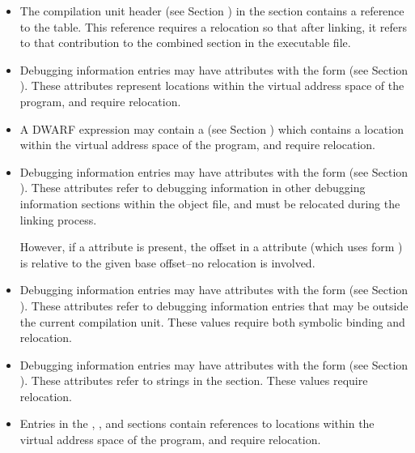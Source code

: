 \begin{itemize}
\item The compilation unit header (see Section 
) in the \dotdebuginfo{}
section contains a reference to the \dotdebugabbrev{} table. This
reference requires a relocation so that after linking, it refers to
that contribution to the combined \dotdebugabbrev{} section in the
executable file.

\item Debugging information entries may have attributes with the form
\DWFORMaddr{} (see Section ). 
These attributes represent locations
within the virtual address space of the program, and require
relocation.

\item A DWARF expression may contain a \DWOPaddr{} (see Section 
) which contains a location within 
the virtual address space of the program, and require relocation.

\item Debugging information entries may have attributes with the form
\DWFORMsecoffset{} (see Section ). 
These attributes refer to
debugging information in other debugging information sections within
the object file, and must be relocated during the linking process.
\par
However, if a \DWATrangesbase{} attribute is present, the offset in
a \DWATranges{} attribute (which uses form \DWFORMsecoffset) is
relative to the given base offset--no relocation is involved.

\item Debugging information entries may have attributes with the form
\DWFORMrefaddr{} (see Section ). 
These attributes refer to
debugging information entries that may be outside the current
compilation unit. These values require both symbolic binding and
relocation.

\item Debugging information entries may have attributes with the form
\DWFORMstrp{} (see Section ). 
These attributes refer to strings in
the \dotdebugstr{} section. These values require relocation.

\item Entries in the \dotdebugaddr, \dotdebugloc{}, \dotdebugranges{} 
and \dotdebugaranges{}
sections contain references to locations within the virtual address
space of the program, and require relocation.


\end{itemize}
